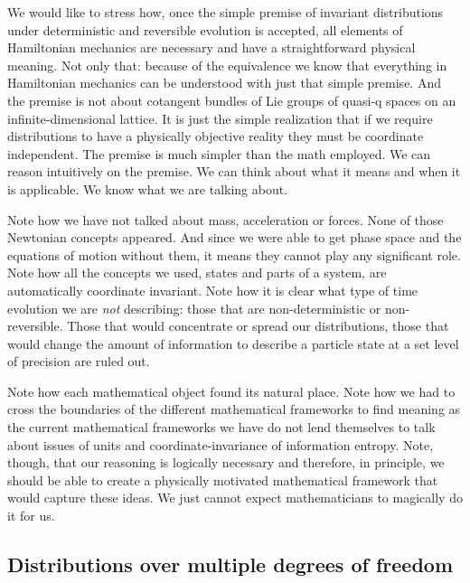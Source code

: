 \documentclass[11pt]{elsarticle}
\begin{document}
We would like to stress how, once the simple premise of invariant distributions under deterministic and reversible evolution is accepted, all elements of Hamiltonian mechanics are necessary and have a straightforward physical meaning. Not only that: because of the equivalence we know that everything in Hamiltonian mechanics can be understood with just that simple premise. And the premise is not about cotangent bundles of Lie groups of quasi-q spaces on an infinite-dimensional lattice. It is just the simple realization that if we require distributions to have a physically objective reality they must be coordinate independent. The premise is much simpler than the math employed. We can reason intuitively on the premise. We can think about what it means and when it is applicable. We know what we are talking about.

Note how we have not talked about mass, acceleration or forces. None of those Newtonian concepts appeared. And since we were able to get phase space and the equations of motion without them, it means they cannot play any significant role. Note how all the concepts we used, states and parts of a system, are automatically coordinate invariant. Note how it is clear what type of time evolution we are \emph{not} describing: those that are non-deterministic or non-reversible. Those that would concentrate or spread our distributions, those that would change the amount of information to describe a particle state at a set level of precision are ruled out.

Note how each mathematical object found its natural place. Note how we had to cross the boundaries of the different mathematical frameworks to find meaning as the current mathematical frameworks we have do not lend themselves to talk about issues of units and coordinate-invariance of information entropy. Note, though, that our reasoning is logically necessary and therefore, in principle, we should be able to create a physically motivated mathematical framework that would capture these ideas. We just cannot expect mathematicians to magically do it for us.

\subsection*{Distributions over multiple degrees of freedom}
\end{document}
